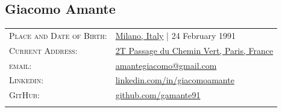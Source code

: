 \documentclass[a4paper,10pt]{article}
\begin{document}
	
	\pagestyle{empty}

	\begin{minipage}{.65\textwidth}
		\vspace{-5mm}
		\begin{flushleft}
			\section{\Huge Giacomo Amante}	
			\begin{tabular}{ll}
				\textsc{Place and Date of Birth:} & \href{https://www.google.com/maps/place/milano}{Milano, Italy} | 24 February 1991 \\
				\textsc{Current Address:} & \href{https://www.google.it/maps/place/2+Passage+du+Chemin+Vert,+75011+Paris/@48.8597221,2.3725467,17z/data=!3m1!4b1!4m5!3m4!1s0x47e66df96ea289b5:0xdb763fce45ffb863!8m2!3d48.8597221!4d2.3747354}{2T Passage du Chemin Vert, Paris, France}\\
				\textsc{email:} & \href{mailto:amantegiacomo@gmail.com}{amantegiacomo@gmail.com} \\
				\textsc{Linkedin:} & 
				\href{http://www.linkedin.com/in/giacomoamante}{\color{black}linkedin.com/in/giacomoamante}\\
				\textsc{GitHub:} & \href{https://github.com/gamante91}{github.com/gamante91}\\
				\multicolumn{2}{c}{} \\
			\end{tabular}				
		\end{flushleft}
	\end{minipage}%
	\hspace{10mm}%
\end{document}
